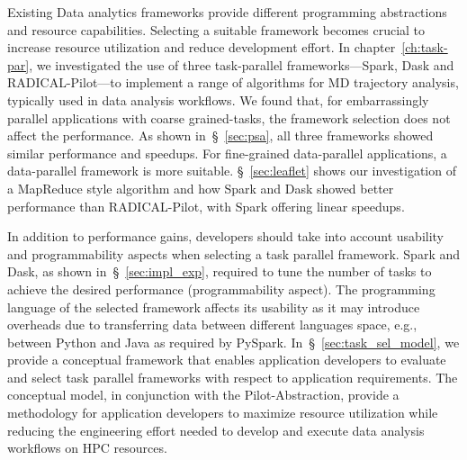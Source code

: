 Existing Data analytics frameworks provide different programming abstractions 
and resource capabilities. Selecting a suitable framework becomes crucial to
increase resource utilization and reduce development effort.
In chapter~\ref{ch:task-par}, we investigated the use of three task-parallel
frameworks---Spark, Dask and RADICAL-Pilot---to implement a range of algorithms
for MD trajectory analysis, typically used in data analysis workflows. We found
that, for embarrassingly parallel applications with coarse  grained-tasks, the
framework selection does not affect the performance. As shown
in~\S~\ref{sec:psa}, all three frameworks showed similar performance and
speedups. For fine-grained data-parallel applications, a  data-parallel
framework is more suitable. \S~\ref{sec:leaflet} shows our investigation of a
MapReduce style algorithm and how Spark and Dask showed better performance than
RADICAL-Pilot, with Spark offering linear speedups.

In addition to performance gains, developers should take into account usability
and programmability aspects when selecting a task parallel framework. Spark and
Dask, as shown in~\S~\ref{sec:impl_exp}, required to tune the number of tasks to
achieve the desired performance (programmability aspect). The programming
language of the selected framework affects its usability as it may introduce
overheads due to transferring data between different languages space, e.g.,
between Python and Java as required by PySpark. In~\S~\ref{sec:task_sel_model},
we provide a conceptual framework that enables application developers to
evaluate and select task parallel frameworks with respect to application
requirements. The conceptual model, in conjunction with the Pilot-Abstraction,
provide a methodology for application developers to maximize resource 
utilization while reducing the engineering effort needed to develop and execute 
data analysis workflows on HPC resources.

